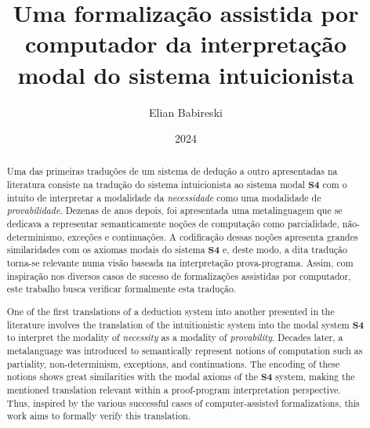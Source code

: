 


    \title{Uma formalização assistida por computador da interpretação modal do sistema intuicionista}
    \author{Elian Babireski}
    \date{2024}

    \maketitle

    \begin{abstract}
        Uma das primeiras traduções de um sistema de dedução a outro apresentadas na literatura consiste na tradução do sistema intuicionista ao sistema modal $\mathbf{S4}$ com o intuito de interpretar a modalidade da \emph{necessidade} como uma modalidade de \emph{provabilidade}. Dezenas de anos depois, foi apresentada uma metalinguagem que se dedicava a representar semanticamente noções de computação como parcialidade, não-determinismo, exceções e continuações. A codificação dessas noções apresenta grandes similaridades com os axiomas modais do sistema $\mathbf{S4}$ e, deste modo, a dita tradução torna-se relevante numa visão baseada na interpretação prova-programa. Assim, com inspiração nos diversos casos de sucesso de formalizações assistidas por computador, este trabalho busca verificar formalmente esta tradução.
    \end{abstract}

    \begin{otherlanguage}{english} 
        \begin{abstract}
            One of the first translations of a deduction system into another presented in the literature involves the translation of the intuitionistic system into the modal system $\mathbf{S4}$ to interpret the modality of \emph{necessity} as a modality of \emph{provability}. Decades later, a metalanguage was introduced to semantically represent notions of computation such as partiality, non-determinism, exceptions, and continuations. The encoding of these notions shows great similarities with the modal axioms of the $\mathbf{S4}$ system, making the mentioned translation relevant within a proof-program interpretation perspective. Thus, inspired by the various successful cases of computer-assisted formalizations, this work aims to formally verify this translation.
        \end{abstract}
    \end{otherlanguage}

    \tableofcontents

